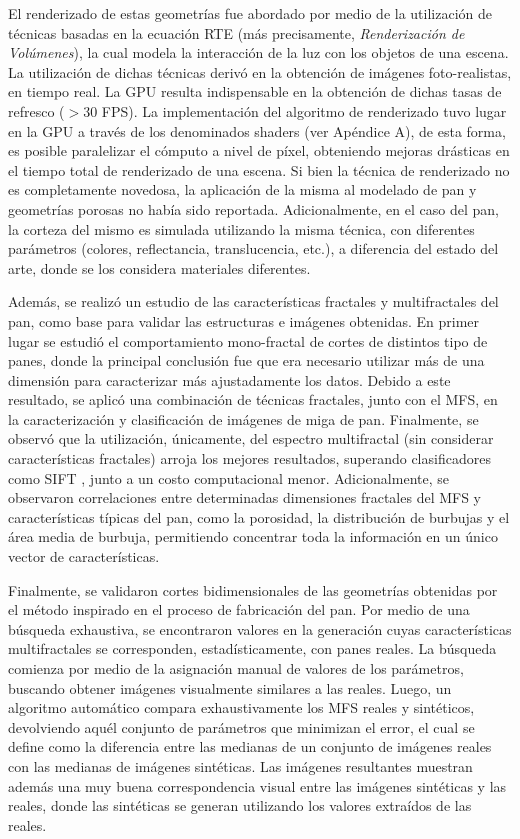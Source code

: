 El renderizado de estas geometrías fue abordado por medio de la utilización de técnicas basadas en la ecuación RTE (más precisamente, {\em Renderización de Volúmenes}), la cual modela la interacción de la luz con los objetos de una escena.
La utilización de dichas técnicas derivó en la obtención de imágenes foto-realistas, en tiempo real.
La GPU resulta indispensable en la obtención de dichas tasas de refresco ($> 30 $ FPS).
La implementación del algoritmo de renderizado tuvo lugar en la GPU a través de los denominados shaders (ver Apéndice A), de esta forma, es posible paralelizar el cómputo a nivel de píxel, obteniendo mejoras drásticas en el tiempo total de renderizado de una escena.
Si bien la técnica de renderizado no es completamente novedosa, la aplicación de la misma al modelado de pan y geometrías porosas no había sido reportada.
Adicionalmente, en el caso del pan, la corteza del mismo es simulada utilizando la misma técnica, con diferentes parámetros (colores, reflectancia, translucencia, etc.), a diferencia del estado del arte, donde se los considera materiales diferentes.


Además, se realizó un estudio de las características fractales y multifractales del pan, como base para validar las estructuras e imágenes obtenidas.
En primer lugar se estudió el comportamiento mono-fractal de cortes de distintos tipo de panes, donde la principal conclusión fue que era necesario utilizar más de una dimensión para caracterizar más ajustadamente los datos.
Debido a este resultado, se aplicó una combinación de técnicas fractales, junto con el MFS, en la caracterización y clasificación de imágenes de miga de pan. Finalmente, se observó que la utilización, únicamente, del espectro multifractal (sin considerar características fractales) arroja los mejores resultados, superando clasificadores como SIFT \cite{Lowe2004}, junto a un costo computacional menor.
Adicionalmente, se observaron correlaciones entre determinadas dimensiones fractales del MFS y características típicas del pan, como la porosidad, la distribución de burbujas y el área media de burbuja, permitiendo concentrar toda la información en un único vector de características.

Finalmente, se validaron cortes bidimensionales de las geometrías obtenidas por el método inspirado en el proceso de fabricación del pan.
Por medio de una búsqueda exhaustiva, se encontraron valores en la generación cuyas características multifractales se corresponden, estadísticamente, con panes reales.
La búsqueda comienza por medio de la asignación manual de valores de los parámetros, buscando obtener imágenes visualmente similares a las reales.
Luego, un algoritmo automático compara exhaustivamente los MFS reales y sintéticos, devolviendo aquél conjunto de parámetros que minimizan el error, el cual se define como la diferencia entre las medianas de un conjunto de imágenes reales con las medianas de imágenes sintéticas.
Las imágenes resultantes muestran además una muy buena correspondencia visual entre las imágenes sintéticas y las reales, donde las sintéticas se generan utilizando los valores extraídos de las reales.

